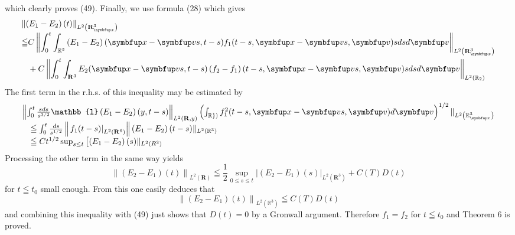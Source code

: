 which clearly proves (49). Finally, we use formula (28) which gives
\[
\begin{array}{l}
\left\|\left(E_{1}-E_{2}\right)(t)\right\|_{L^{2}\left(\mathbf{R}_{\vx}^{3}\right)} \\
\begin{aligned}
\leqq & C\left\|\int_{0}^{t} \int_{\mathbb{R}^{3}}\left(E_{1}-E_{2}\right)(\vx-\vv s, t-s) f_{1}(t-s, \vx-\vv s, \vv) s d s d \vv\right\|_{L^{2}\left(\mathbf{R}_{\vx}^{3}\right)} \\
&+C\left\|\int_{0}^{t} \int_{\mathbf{R}^{3}} E_{2}(\vx-\vv s, t-s)\left(f_{2}-f_{1}\right)(t-s, \vx-\vv s, \vv) s d s d \vv\right\|_{L^{2}\left(\mathbb{R}_{2}\right)}
\end{aligned}
\end{array}
\]
The first term in the r.h.s. of this inequality may be estimated by
\[
\begin{array}{l}
\left\|\int_{0}^{t} \frac{s d s}{s^{3 / 2}} \mathbb{l}\left(E_{1}-E_{2}\right)(y, t-s)\right\|_{L^{2}(\mathbf{R}, y)}\left(\int_{\mathbb{R}\})} f_{1}^{2}(t-s, \vx-\vv s, \vv) d \vv\right)^{1 / 2} \|_{L^{2}\left(\mathbb{R}_{\vx}^{3}\right)} \\
\quad \leqq \int_{0}^{t} \frac{d s}{s^{1 / 2}}\left\|\left.f_{1}(t-s)\right|_{L^{2}\left(\mathbf{R}^{6}\right)}\right\|\left(E_{1}-E_{2}\right)(t-s) \|_{L^{2}\left(\mathbb{R}^{3}\right)} \\
\quad \leqq C t^{1 / 2} \sup _{s \leq t}\left[\left(E_{1}-E_{2}\right)(s) \|_{L^{2}\left(R^{3}\right)}\right.
\end{array}
\]
Processing the other term in the same way yields
\[
\left\|\left(E_{2}-E_{1}\right)(t)\right\|_{L^{2}(\mathbf{R})} \leqq \frac{1}{2} \sup _{0 \leq s \leq t}\left|\left(E_{2}-E_{1}\right)(s)\right|_{L^{2}\left(\mathbf{R}^{3}\right)}+C(T) D(t)
\]
for $t \leqq t_{0}$ small enough. From this one easily deduces that
\[
\left\|\left(E_{2}-E_{1}\right)(t)\right\|_{L^{2}\left(\mathbb{R}^{3}\right)} \leqq C(T) D(t)
\]
and combining this inequality with (49) just shows that $D(t)=0$ by a Gronwall argument. Therefore $f_{1}=f_{2}$ for $t \leqq t_{0}$ and Theorem 6 is proved.